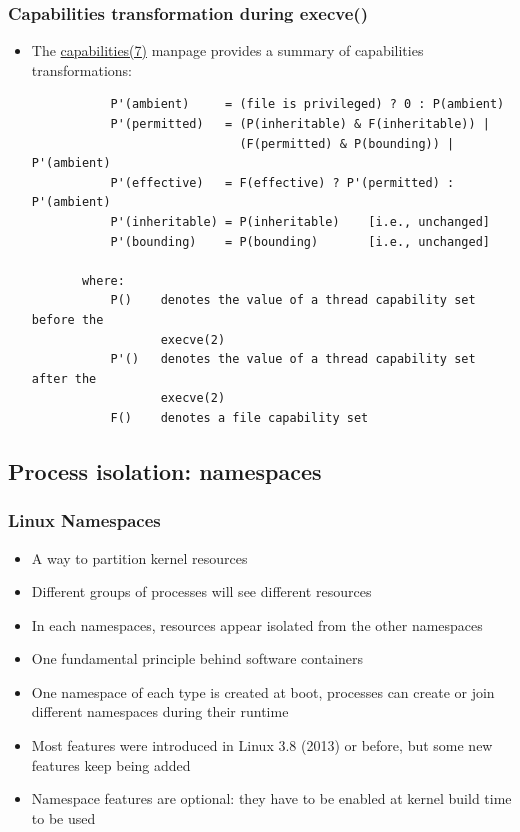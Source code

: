 \begin{frame}[fragile]
	\frametitle{Capabilities transformation during execve()}
	\begin{itemize}
		\item The \href{https://manned.org/capabilities.7}{capabilities(7)} manpage
			provides a summary of capabilities transformations:
			\begin{block}{}
				{\small
				\begin{verbatim}
           P'(ambient)     = (file is privileged) ? 0 : P(ambient)
           P'(permitted)   = (P(inheritable) & F(inheritable)) |
                             (F(permitted) & P(bounding)) | P'(ambient)
           P'(effective)   = F(effective) ? P'(permitted) : P'(ambient)
           P'(inheritable) = P(inheritable)    [i.e., unchanged]
           P'(bounding)    = P(bounding)       [i.e., unchanged]

       where:
           P()    denotes the value of a thread capability set before the
                  execve(2)
           P'()   denotes the value of a thread capability set after the
                  execve(2)
           F()    denotes a file capability set
\end{verbatim}
}
			\end{block}
	\end{itemize}
\end{frame}

\subsection{Process isolation: namespaces}

\begin{frame}
	\frametitle{Linux Namespaces}
	\begin{itemize}
		\item A way to partition kernel resources
		\item Different groups of processes will see different resources
		\item In each namespaces, resources appear isolated from the other
			namespaces
		\item One fundamental principle behind software containers
		\item One namespace of each type is created at boot, processes can create or
			join different namespaces during their runtime
		\item Most features were introduced in Linux 3.8 (2013) or before, but some
			new features keep being added
		\item Namespace features are optional: they have to be enabled at kernel
			build time to be used
	\end{itemize}
\end{frame}

